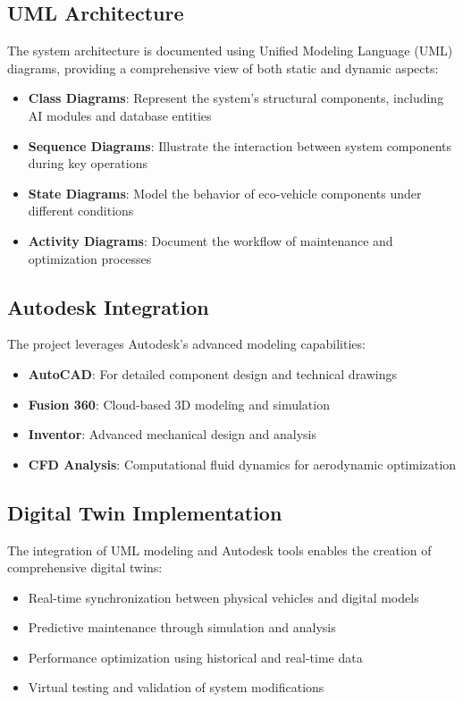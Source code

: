 \documentclass[12pt,a4paper]{article}
\begin{document}
\subsection{UML Architecture}
The system architecture is documented using Unified Modeling Language (UML) diagrams, providing a comprehensive view of both static and dynamic aspects:
\begin{itemize}
    \item \textbf{Class Diagrams}: Represent the system's structural components, including AI modules and database entities
    \item \textbf{Sequence Diagrams}: Illustrate the interaction between system components during key operations
    \item \textbf{State Diagrams}: Model the behavior of eco-vehicle components under different conditions
    \item \textbf{Activity Diagrams}: Document the workflow of maintenance and optimization processes
\end{itemize}

\subsection{Autodesk Integration}
The project leverages Autodesk's advanced modeling capabilities:
\begin{itemize}
    \item \textbf{AutoCAD}: For detailed component design and technical drawings
    \item \textbf{Fusion 360}: Cloud-based 3D modeling and simulation
    \item \textbf{Inventor}: Advanced mechanical design and analysis
    \item \textbf{CFD Analysis}: Computational fluid dynamics for aerodynamic optimization
\end{itemize}

\subsection{Digital Twin Implementation}
The integration of UML modeling and Autodesk tools enables the creation of comprehensive digital twins:
\begin{itemize}
    \item Real-time synchronization between physical vehicles and digital models
    \item Predictive maintenance through simulation and analysis
    \item Performance optimization using historical and real-time data
    \item Virtual testing and validation of system modifications
\end{itemize}
\end{document}

